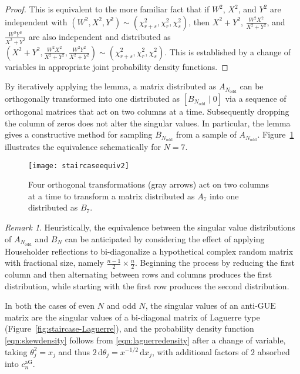 \documentclass[pdftex, oneside, 10pt, letterpaper]{amsart}
\theoremstyle{plain}
\theoremstyle{definition}
\theoremstyle{remark}
\newtheorem*{rem}{Remark}
\begin{document}
\begin{proof}
  This is equivalent to the more familiar fact that if $W^2$, $X^2$,
  and $Y^2$ are independent with
  $(W^2,X^2,Y^2)\sim(\chi^2_{r+s},\chi^2_{r},\chi^2_{s})$, then
  $X^2+Y^2$, $\frac{W^2X^2}{X^2+Y^2}$, and $\frac{W^2Y^2}{X^2+Y^2}$
  are also independent and distributed as
  $\left(X^2+Y^2,\frac{W^2X^2}{X^2+Y^2},\frac{W^2Y^2}{X^2+Y^2}\right)\sim(\chi^2_{r+s},\chi^2_{r},\chi^2_{s})$.
  This is established by a change of variables in appropriate
  joint probability density functions.
\end{proof}

By iteratively applying the lemma, a matrix distributed as
$A_{N_{\text{odd}}}$ can be orthogonally transformed into one
distributed as $[B_{N_\text{odd}}\mid 0]$ via a sequence of orthogonal
matrices that act on two columns at a time.  Subsequently dropping the
column of zeros does not alter the singular values.  In particular,
the lemma gives a constructive method for sampling $B_{N_\text{odd}}$
from a sample of $A_{N_\text{odd}}$.  Figure~\ref{fig:staircaseequiv}
illustrates the equivalence schematically for $N=7$.

\begin{figure}[!htbp]
\texttt{[image: staircaseequiv2]}
\caption{Four orthogonal transformations (gray arrows)
  act on two columns at a time to transform a matrix distributed as
  $A_7$ into one distributed as $B_7$.  
}\label{fig:staircaseequiv}
\end{figure}

\begin{rem}
  Heuristically, the equivalence between the singular value
  distributions of $A_{N_{\text{odd}}}$ and $B_{N}$ can be anticipated by
  considering the effect of applying Householder reflections to
  bi-diagonalize a hypothetical complex random matrix with fractional
  size, namely $\frac{n-1}{2}\times{}\frac{n}{2}$.  Beginning the
  process by reducing the first column and then alternating between
  rows and columns produces the first distribution, while starting
  with the first row produces the second distribution.
\end{rem}

In both the cases of even $N$ and odd $N$, the singular values of an
anti-{\ensuremath{\mathrm{GUE}}}{} matrix are the singular values of a bi-diagonal matrix of
Laguerre type (Figure~\ref{fig:staircase-Laguerre}), and the
probability density function \eqref{eqn:skewdensity} follows from
\eqref{eqn:laguerredensity} after a change of variable, taking
$\theta_j^2=x_j$ and thus
$2\,\mathrm{d}\theta_j=x^{-1/2}\,\mathrm{d}x_j$, with additional
factors of $2$ absorbed into $c_n^{\mathrm{aG}}$.
\end{document}
